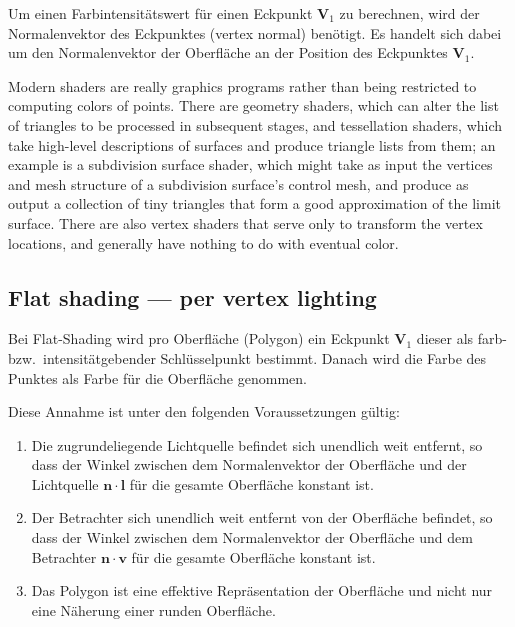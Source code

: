 Um einen Farbintensitätswert für einen Eckpunkt $\bm{V}_{1}$ zu berechnen, wird der
Normalenvektor des Eckpunktes (vertex normal) benötigt. Es handelt sich dabei
um den Normalenvektor der Oberfläche an der Position des Eckpunktes $\bm{V}_{1}$.

Modern shaders are really graphics programs rather than being restricted to
computing colors of points. There are geometry shaders, which can alter the
list of triangles to be processed in subsequent stages, and tessellation
shaders, which take high-level descriptions of surfaces and produce triangle
lists from them; an example is a subdivision surface shader, which might take
as input the vertices and mesh structure of a subdivision surface’s control
mesh, and produce as output a collection of tiny triangles that form a good
approximation of the limit surface. There are also vertex shaders that serve
only to transform the vertex locations, and generally have nothing to do with
eventual color.

\subsection{Flat shading --- per vertex lighting}
\label{subsec:flat_shading}


Bei Flat-Shading wird pro Oberfläche (Polygon) ein Eckpunkt $\bm{V}_{1}$ dieser als
farb- bzw.\ intensitätgebender Schlüsselpunkt bestimmt. Danach wird die Farbe
des Punktes als Farbe für die Oberfläche genommen.

Diese Annahme ist unter den folgenden Voraussetzungen gültig:
\begin{enumerate}
    \item{Die zugrundeliegende Lichtquelle befindet sich unendlich weit
            entfernt, so dass der Winkel zwischen dem
            Normalenvektor der Oberfläche und der Lichtquelle
            $\bm{n}\cdot{}\bm{l}$ für die gesamte Oberfläche konstant ist.}
    \item{Der Betrachter sich unendlich weit entfernt von der Oberfläche
            befindet, so dass der Winkel zwischen dem Normalenvektor der
            Oberfläche und dem Betrachter $\bm{n}\cdot{}\bm{v}$ für die
            gesamte Oberfläche konstant ist.}
    \item{Das Polygon ist eine effektive Repräsentation der Oberfläche
            und nicht nur eine Näherung einer runden Oberfläche.}
\end{enumerate}

